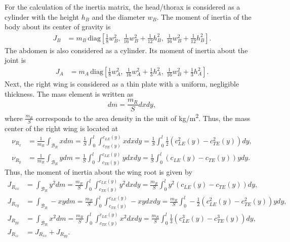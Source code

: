 \documentclass[10pt]{article}
\begin{document}
For the calculation of the inertia matrix, the head/thorax is considered as a cylinder with the height $h_B$ and the diameter $w_B$.
The moment of inertia of the body about its center of gravity is 
\begin{align*}
    J_B & = m_B\, \mathrm{diag} [ \frac{1}{8} w_B^2 , \; \frac{1}{16}w_B^2 + \frac{1}{12}h_B^2, \; \frac{1}{16}w_B^2 + \frac{1}{12} h_B^2] .
\end{align*}
The abdomen is also considered as a cylinder. 
Its moment of inertia about the joint is
\begin{align*}
    J_A & = m_A\, \mathrm{diag} [ \frac{1}{8} w_A^2 ,\;  \frac{1}{16}w_A^2 + \frac{1}{3}h_A^2, \; \frac{1}{16}w_B^2 + \frac{1}{3} h_A^2].
\end{align*}
Next, the right wing is considered as a thin plate with a uniform, negligible thickness. 
The mass element is written as
\[
    dm = \frac{m_R}{S} dx dy,
\]
where $\frac{m_R}{S}$ corresponds to the area density in the unit of \si{kg/m^2}.
Thus, the mass center of the right wing is located at
\begin{align*}
    \nu_{R_x} & = \frac{1}{m_R} \int_{\mathcal{B}_R} x  dm
                = \frac{1}{S} \int_{0}^l \int_{c_{TE}(y)}^{c_{LE}(y)} x dx dy
                = \frac{1}{S} \int_0^l \frac{1}{2}(c_{LE}^2(y)-c_{TE}^2(y)) dy,\\
    \nu_{R_y} & = \frac{1}{m_R} \int_{\mathcal{B}_R} y  dm
                = \frac{1}{S} \int_{0}^l \int_{c_{TE}(y)}^{c_{LE}(y)} y dx dy
                = \frac{1}{S} \int_0^l (c_{LE}(y)-c_{TE}(y))y dy.
\end{align*}
Thus, the moment of inertia about the wing root is given by
\begin{align*}
    J_{R_{xx}} & = \int_{\mathcal{B}_R} y^2 dm 
                = \frac{m_R}{S} \int_{0}^l \int_{c_{TE}(y)}^{c_{LE}(y)} y^2 dx dy
                = \frac{m_R}{S} \int_0^l y^2(c_{LE}(y)-c_{TE}(y)) dy,\\
    J_{R_{xy}} & = \int_{\mathcal{B}_R} -x y dm 
                = \frac{m_R}{S} \int_{0}^l \int_{c_{TE}(y)}^{c_{LE}(y)} -xy dx  dy
                = \frac{m_R}{S} \int_0^l -\frac{1}{2}(c_{LE}^2(y)-c_{TE}^2(y))y dy,\\
    J_{R_{yy}} & = \int_{\mathcal{B}_R} x^2 dm 
                = \frac{m_R}{S} \int_{0}^l \int_{c_{TE}(y)}^{c_{LE}(y)} x^2 dx  dy
                = \frac{m_R}{S} \int_0^l \frac{1}{3}(c_{LE}^3(y)-c_{TE}^3(y)) dy,\\
                J_{R_{zz}} & = J_{R_{xx}} + J_{R_{yy}}.
\end{align*}
\end{document}
